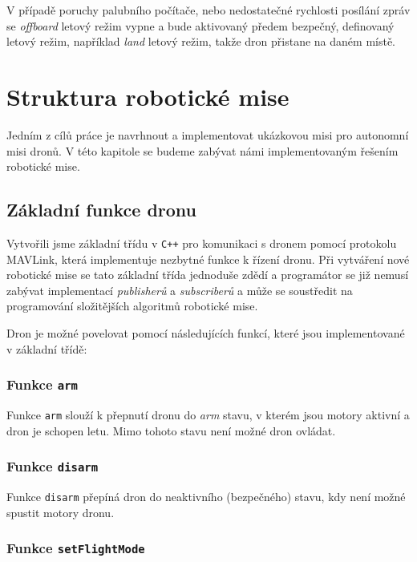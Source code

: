 V případě poruchy palubního počítače, nebo nedostatečné rychlosti posílání zpráv se \textit{offboard} letový režim vypne a bude aktivovaný předem bezpečný, definovaný letový režim, například \textit{land} letový režim, takže dron přistane na daném místě. \cite{PX4docs}

\section{Struktura robotické mise}

Jedním z cílů práce je navrhnout a implementovat ukázkovou misi pro autonomní misi dronů. V této kapitole se budeme zabývat námi implementovaným řešením robotické mise.

\subsection{Základní funkce dronu}

Vytvořili jsme základní třídu  v \texttt{C++} pro komunikaci s dronem pomocí protokolu MAVLink, která implementuje nezbytné funkce k řízení dronu. Při vytváření nové robotické mise se tato základní třída jednoduše zdědí a programátor se již nemusí zabývat implementací \textit{publisherů} a \textit{subscriberů} a může se soustředit na programování složitějších algoritmů robotické mise.

Dron je možné povelovat pomocí následujících funkcí, které jsou implementované v základní třídě:

\subsubsection{Funkce \texttt{arm}}

Funkce \texttt{arm} slouží k přepnutí dronu do \textit{arm} stavu, v kterém jsou motory aktivní a dron je schopen letu. Mimo tohoto stavu není možné dron ovládat. 

\subsubsection{Funkce \texttt{disarm}}

Funkce \texttt{disarm} přepíná dron do neaktivního (bezpečného) stavu, kdy není možné spustit motory dronu.

\subsubsection{Funkce \texttt{setFlightMode}}

